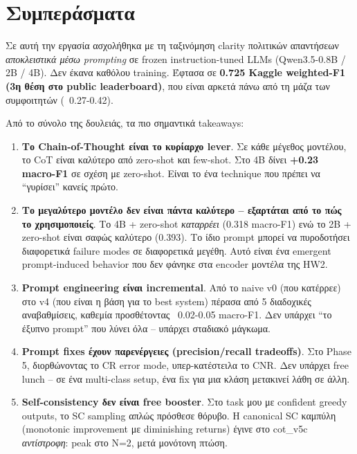 \documentclass[12pt]{fphw}
\begin{document}
\section{Συμπεράσματα}

Σε αυτή την εργασία ασχολήθηκα με τη ταξινόμηση clarity πολιτικών απαντήσεων \emph{αποκλειστικά μέσω prompting} σε frozen instruction-tuned LLMs (Qwen3.5-0.8B / 2B / 4B). Δεν έκανα καθόλου training. Έφτασα σε \textbf{0.725 Kaggle weighted-F1 (3η θέση στο public leaderboard)}, που είναι αρκετά πάνω από τη μάζα των συμφοιτητών (~0.27-0.42).

Από το σύνολο της δουλειάς, τα πιο σημαντικά takeaways:

\begin{enumerate}
    \item \textbf{Το Chain-of-Thought είναι το κυρίαρχο lever}. Σε κάθε μέγεθος μοντέλου, το CoT είναι καλύτερο από zero-shot και few-shot. Στο 4B δίνει \textbf{+0.23 macro-F1} σε σχέση με zero-shot. Είναι το ένα technique που πρέπει να ``γυρίσει'' κανείς πρώτο.

    \item \textbf{Το μεγαλύτερο μοντέλο δεν είναι πάντα καλύτερο -- εξαρτάται από το πώς το χρησιμοποιείς}. Το 4B + zero-shot \emph{καταρρέει} (0.318 macro-F1) ενώ το 2B + zero-shot είναι σαφώς καλύτερο (0.393). Το ίδιο prompt μπορεί να πυροδοτήσει διαφορετικά failure modes σε διαφορετικά μεγέθη. Αυτό είναι ένα emergent prompt-induced behavior που δεν φάνηκε στα encoder μοντέλα της HW2.

    \item \textbf{Prompt engineering είναι incremental}. Από το naive v0 (που κατέρρεε) στο v4 (που είναι η βάση για το best system) πέρασα από 5 διαδοχικές αναβαθμίσεις, καθεμία προσθέτοντας ~0.02-0.05 macro-F1. Δεν υπάρχει ``το έξυπνο prompt'' που λύνει όλα -- υπάρχει σταδιακό μάγκωμα.

    \item \textbf{Prompt fixes έχουν παρενέργειες (precision/recall tradeoffs)}. Στο Phase 5, διορθώνοντας το CR error mode, υπερ-κατέστειλα το CNR. Δεν υπάρχει free lunch -- σε ένα multi-class setup, ένα fix για μια κλάση μετακινεί λάθη σε άλλη.

    \item \textbf{Self-consistency δεν είναι free booster}. Στο task μου με confident greedy outputs, το SC sampling απλώς πρόσθεσε θόρυβο. Η canonical SC καμπύλη (monotonic improvement με diminishing returns) έγινε στο cot\_v5c \emph{αντίστροφη}: peak στο N=2, μετά μονότονη πτώση.


\end{enumerate}
\end{document}
